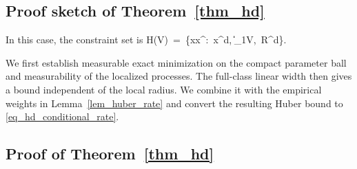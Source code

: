 \documentclass[twoside,11pt]{article}
\newcommand{\rev}[1]{{\color{revisionred}#1}}
\begin{document}
\subsection{Proof sketch of Theorem~\ref{thm_hd}}
In this case, the constraint set is
\bea
\rev{H(V) \,=\, \{x\mapsto x^\top\beta:\ x\in[0,1]^d,\ \|\beta\|_1\leq V,\ \beta\in\mathbb R^d\}.}
\bea

\rev{We first establish measurable exact minimization on the compact
parameter ball and measurability of the localized processes. The
full-class linear width then gives a bound independent of the local
radius. We combine it with the empirical weights in
Lemma~\ref{lem_huber_rate} and convert the resulting Huber bound to
\eqref{eq_hd_conditional_rate}.}

\subsection{Proof of Theorem~\ref{thm_hd}}
\end{document}
